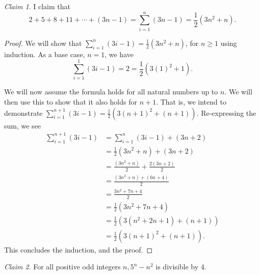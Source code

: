 \documentclass[12pt,oneside]{amsart}
\theoremstyle{remark}
\newtheorem{claim}{Claim}[exer]
\begin{document}
\begin{claim}
I claim that \[ 2 + 5 + 8 + 11 + \cdots + (3n - 1) = \sum_{i = 1}^n (3n - 1) = \frac{1}{2}(3n^2 + n). \]
\end{claim}

\begin{proof}
We will show that $\sum_{i = 1}^n (3i - 1) = \frac{1}{2}(3n^2 + n)$, for $n \geq 1$ using induction. As a base case, $n = 1$, we have \[ \sum_{i = 1}^1 (3i - 1) = 2 = \frac{1}{2}(3(1)^2 + 1). \]

We will now assume the formula holds for all natural numbers up to $n$. We will then use this to show that it also holds for $n + 1$. That is, we intend to demonstrate $\sum_{i = 1}^{n+1} (3i - 1) = \frac{1}{2}(3(n + 1)^2 + (n + 1))$. Re-expressing the sum, we see
\begin{align*}
\sum_{i = 1}^{n+1} (3i - 1) &= \sum_{i = 1}^{n} (3i - 1) + (3n + 2) \\
                            &= \frac{1}{2}(3n^2 + n) + (3n + 2) \tag{by hypothesis} \\
                            &= \frac{(3n^2 + n)}{2} + \frac{2(3n + 2)}{2} \tag{ensuring a common denominator} \\
                            &= \frac{(3n^2 + n) + (6n + 4)}{2} \\
                            &= \frac{3n^2 + 7n + 4}{2} \tag{simplifying} \\
                            &= \frac{1}{2}(3n^2 + 7n + 4) \\
                            &= \frac{1}{2}(3(n^2 + 2n + 1) + (n + 1)) \\
                            &= \frac{1}{2}(3(n + 1)^2 + (n + 1)).
\end{align*}
This concludes the induction, and the proof.
\end{proof}

\begin{claim}
For all positive odd integers $n, 5^n - n^2$ is divisible by 4.
\end{claim}
\end{document}
